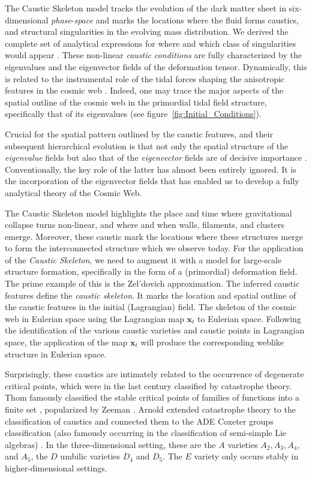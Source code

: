 \documentclass[a4paper, 11pt]{article}
\begin{document}
The Caustic Skeleton model tracks the evolution of the dark matter sheet in six-dimen\-sional \textit{phase}-\textit{space} and marks the locations where the fluid forms caustics, and structural singularities in the evolving mass distribution. We derived the complete set of analytical expressions for where and which class of singularities would appear \cite{Feldbrugge:2018}. These non-linear {\it caustic conditions} are fully characterized by the eigenvalues and the eigenvector fields of the deformation tensor. Dynamically, this is related to the instrumental role of the tidal forces shaping the anisotropic features in the cosmic web \cite[see e.g.][]{Weygaert:2008}. Indeed, one may trace the major aspects of the spatial outline of the cosmic web in the primordial tidal field structure, specifically that of its eigenvalues (see figure~\ref{fig:Initial_Conditions}).

Crucial for the spatial pattern outlined by the caustic features, and their subsequent hierarchical evolution is that not only the spatial structure of the {\it eigenvalue} fields but also that of the {\it eigenvector} fields are of decisive importance \cite{Feldbrugge:2018}. Conventionally, the key role of the latter has almost been entirely ignored. It is the incorporation of the eigenvector fields that has enabled us to develop a fully analytical theory of the Cosmic Web. 

The Caustic Skeleton model highlights the place and time where gravitational collapse turns non-linear, and where and when walls, filaments, and clusters emerge. Moreover, these caustic mark the locations where these structures merge to form the interconnected structure which we observe today. For the application of the \textit{Caustic Skeleton}, we need to augment it with a model for large-scale structure formation, specifically in the form of a (primordial) deformation field. The prime example of this is the Zel'dovich approximation. The inferred caustic features define the \textit{caustic skeleton}. It marks the location and spatial outline of the caustic features in the initial (Lagrangian) field. The skeleton of the cosmic web in Eulerian space using the Lagrangian map $\bm{x}_t$ to Eulerian space. Following the identification of the various caustic varieties and caustic points in Lagrangian space, the application of the map $\bm{x}_t$ will produce the corresponding weblike structure in Eulerian space. 

\bigskip
Surprisingly, these caustics are intimately related to the occurrence of degenerate critical points, which were in the last century classified by catastrophe theory. Thom famously classified the stable critical points of families of functions into a finite set \cite{Thom:1975}, popularized by Zeeman \cite{Zeeman:1972,Zeeman:1976}. Arnold extended catastrophe theory to the classification of caustics and connected them to the ADE Coxeter groups classification (also famously occurring in the classification of semi-simple Lie algebras) \cite{Arnold:1972,Arnold:1976,Arnold:1984}. In the three-dimensional setting, these are the $A$ varieties $A_2,A_3,A_4,$ and $A_5$, the $D$ umbilic varieties $D_4$ and $D_5$. The $E$ variety only occurs stably in higher-dimensional settings.
\end{document}
